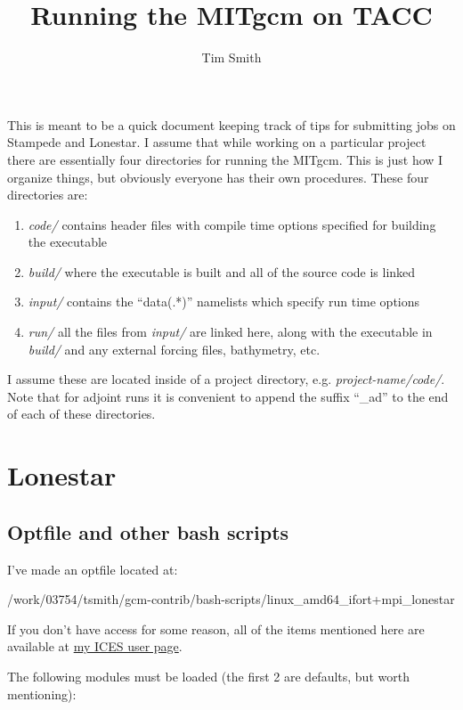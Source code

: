 \documentclass[a4paper,11pt]{article}
\title{\vspace{-10ex}Running the MITgcm on TACC}
\author{Tim Smith}
\date{\vspace{-3ex}}
\begin{document}
\maketitle

	This is meant to be a quick document keeping track of tips for submitting jobs on Stampede and Lonestar. I assume that while working on a particular project there are essentially four directories for running the MITgcm. This is just how I organize things, but obviously everyone has their own procedures. These four directories are: 

	\begin{enumerate}
	  \item \textit{code/} contains header files with compile time options specified for building the executable
	  \item \textit{build/} where the executable is built and all of the source code is linked
	  \item \textit{input/} contains the ``data(.*)'' namelists which specify run time options
	  \item \textit{run/} all the files from \textit{input/} are linked here, along with the executable in \textit{build/} and any external forcing files, bathymetry, etc. 
	\end{enumerate} 

	I assume these are located inside of a project directory, e.g. \textit{ project-name/code/}. Note that for adjoint runs it is convenient to append the suffix ``\_ad'' to the end of each of these directories. 

\section{Lonestar} 
\label{lonestar}

	\subsection{Optfile and other bash scripts}
	
	I've made an optfile located at: 
	
	/work/03754/tsmith/gcm-contrib/bash-scripts/linux\_amd64\_ifort+mpi\_lonestar 

	If you don't have access for some reason, all of the items mentioned here are available at \href{http://users.ices.utexas.edu/~tsmith/bash-scripts/}{my ICES user page}.

	The following modules must be loaded (the first 2 are defaults, but worth mentioning): 
\end{document}
